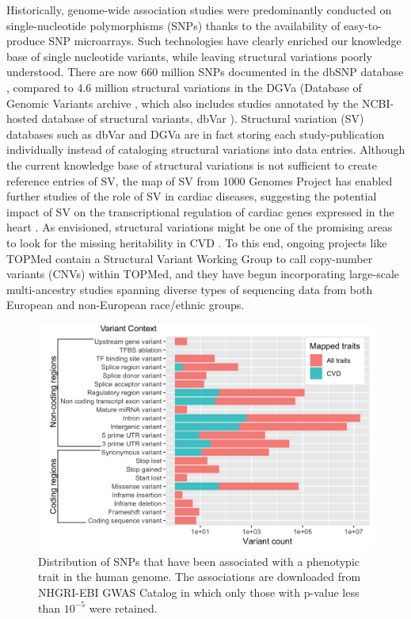 \documentclass[letter]{bioinfo}
\begin{document}
	Historically, genome-wide association studies were predominantly conducted on single-nucleotide polymorphisms (SNPs) thanks to the availability of easy-to-produce SNP microarrays. Such technologies have clearly enriched our knowledge base of single nucleotide variants, while leaving structural variations poorly understood. There are now 660 million SNPs documented in the dbSNP database \citep{NCBI:2018:dbSNP}, compared to 4.6 million structural variations in the DGVa (Database of Genomic Variants archive \citep{EMBL-EBI:2018:Database}, which also includes studies annotated by the NCBI-hosted database of structural variants, dbVar \citep{NCBI:2018:dbVar}).  Structural variation (SV) databases such as dbVar and DGVa are in fact storing each study-publication individually instead of cataloging structural variations into data entries. Although the current knowledge base of structural variations is not sufficient to create reference entries of SV, the map of SV from 1000 Genomes Project \citep{Sudmant:2015:integrated} has enabled further studies of the role of SV in cardiac diseases, suggesting the potential impact of SV on the transcriptional regulation of cardiac genes expressed in the heart \citep{Haas:2018:Genomic}. As envisioned, structural variations might be one of the promising areas to look for the missing heritability in CVD \citep{Eichler:2010:Missing}.  To this end, ongoing projects like TOPMed contain a Structural Variant Working Group to call copy-number variants (CNVs) within TOPMed, and they have begun incorporating large-scale multi-ancestry studies spanning diverse types of sequencing data from both European and non-European race/ethnic groups.  
	\begin{figure}[!tpb]
		\includegraphics[width=1\linewidth]{variant_contexts}
		\caption{Distribution of SNPs that have been associated with a phenotypic trait in the human genome. The associations are downloaded from NHGRI-EBI GWAS Catalog in which only those with p-value less than $10^{-5}$ were retained.}
		\label{fig:variant_context}
	\end{figure}
	
\end{document}
